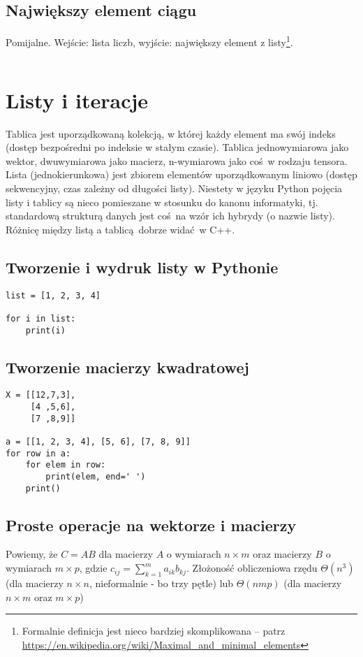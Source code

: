 \documentclass[10pt, oneside]{article}
\theoremstyle{remark}
\begin{document}
\subsection{Największy element ciągu}
Pomijalne. Wejście: lista liczb, wyjście: największy element z listy\footnote{Formalnie definicja jest nieco bardziej skomplikowana -- patrz \url{https://en.wikipedia.org/wiki/Maximal_and_minimal_elements}}.
\inputminted{python}{code/2_max.py}

\section{Listy i iteracje}

Tablica jest uporządkowaną kolekcją, w której każdy element ma swój indeks (dostęp bezpośredni po indeksie w stałym czasie).
Tablica jednowymiarowa jako wektor, dwuwymiarowa jako macierz, n-wymiarowa jako coś w rodzaju tensora.
Lista (jednokierunkowa) jest zbiorem elementów uporządkowanym liniowo (dostęp sekwencyjny, czas zależny od długości listy).
Niestety w języku Python pojęcia listy i tablicy są nieco pomieszane w stosunku do kanonu informatyki, tj. standardową strukturą danych jest coś na wzór ich hybrydy (o nazwie listy).
Różnicę między listą a tablicą dobrze widać w C++.

\subsection{Tworzenie i wydruk listy w Pythonie}
\begin{verbatim}
list = [1, 2, 3, 4]

for i in list:
    print(i)

\end{verbatim}


\subsection{Tworzenie macierzy kwadratowej}
\begin{verbatim}
X = [[12,7,3],
     [4 ,5,6],
     [7 ,8,9]]
     
a = [[1, 2, 3, 4], [5, 6], [7, 8, 9]]
for row in a:
    for elem in row:
        print(elem, end=' ')
    print()
\end{verbatim}


\subsection{Proste operacje na wektorze i macierzy}
Powiemy, że $C =AB$ dla macierzy $A$ o wymiarach $n \times m$ oraz macierzy $B$ o wymiarach $m \times p$, gdzie $c_{{ij}}=\sum _{{k=1}}^{m}a_{{ik}}b_{{kj}}$.
Złożoność obliczeniowa rzędu $\Theta(n^3)$ (dla macierzy $n \times n$, nieformalnie - bo trzy pętle) lub $\Theta(nmp)$ (dla macierzy $n \times m$ oraz $m \times p$)
\end{document}
